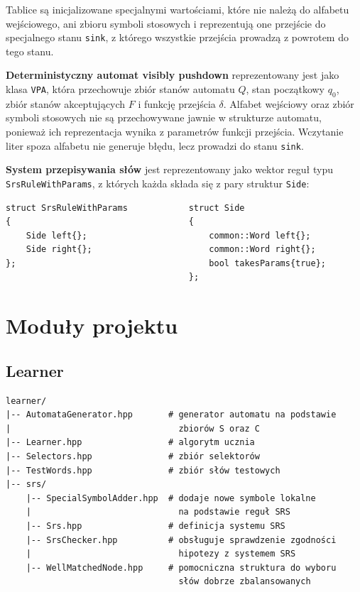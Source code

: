 Tablice są inicjalizowane specjalnymi wartościami, które nie należą do alfabetu wejściowego,
ani zbioru symboli stosowych i reprezentują one przejście do specjalnego stanu \texttt{sink},
z którego wszystkie przejścia prowadzą z powrotem do tego stanu.


\textbf{Deterministyczny automat visibly pushdown} reprezentowany jest jako klasa \texttt{VPA}, która przechowuje zbiór stanów automatu $Q$,
stan początkowy $q_0$, zbiór stanów akceptujących $F$ i funkcję przejścia $\delta$. Alfabet wejściowy oraz zbiór symboli stosowych nie są
przechowywane jawnie w strukturze automatu, ponieważ ich reprezentacja wynika z parametrów funkcji przejścia. Wczytanie liter spoza
alfabetu nie generuje błędu, lecz prowadzi do stanu \texttt{sink}.

\textbf{System przepisywania słów} jest reprezentowany jako wektor reguł typu \texttt{SrsRule\-With\-Params}, z których każda
składa się z pary struktur \texttt{Side}:
\begin{verbatim}
struct SrsRuleWithParams            struct Side
{                                   {
    Side left{};                        common::Word left{};
    Side right{};                       common::Word right{};
};                                      bool takesParams{true};
                                    };
\end{verbatim}
    

\section{Moduły projektu}

\subsection{Learner}
\begin{verbatim}
learner/
|-- AutomataGenerator.hpp       # generator automatu na podstawie
|                                 zbiorów S oraz C
|-- Learner.hpp                 # algorytm ucznia
|-- Selectors.hpp               # zbiór selektorów
|-- TestWords.hpp               # zbiór słów testowych
|-- srs/
    |-- SpecialSymbolAdder.hpp  # dodaje nowe symbole lokalne
    |                             na podstawie reguł SRS
    |-- Srs.hpp                 # definicja systemu SRS
    |-- SrsChecker.hpp          # obsługuje sprawdzenie zgodności
    |                             hipotezy z systemem SRS
    |-- WellMatchedNode.hpp     # pomocniczna struktura do wyboru
                                  słów dobrze zbalansowanych
\end{verbatim}

